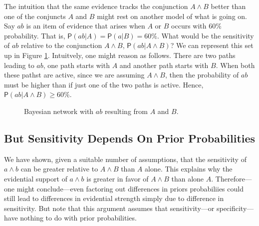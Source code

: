 \documentclass[
  10pt,
  dvipsnames,enabledeprecatedfontcommands]{scrartcl}
\newcommand{\pr}[1]{\mathsf{P}(#1)}
\begin{document}
The intuition that the same evidence tracks the conjunction
\(A\wedge B\) better than one of the conjuncts \(A\) and \(B\) might
rest on another model of what is going on. Say \(ab\) is an item of
evidence that arises when \(A\) or \(B\) occurs with \(60\%\)
probability. That is, \(\pr{ab \vert A}=\pr{a \vert B}=60\%\). What
would be the sensitivity of \(ab\) relative to the conjunction
\(A\wedge B\), \(\pr{ab \vert A\wedge B}\)? We can represent this set up
in Figure \ref{network-ab}. Intuitvely, one might reason as follows.
There are two paths leading to \(ab\), one path starts with \(A\) and
another path starts with \(B\). When both these pathst are active, since
we are assuming \(A\wedge B\), then the probability of \(ab\) must be
higher than if just one of the two paths is active. Hence,
\(\pr{ab \vert A\wedge B}\geq 60\%\).

\begin{center}
\begin{figure}[h!]

\caption{Bayesian network with $ab$ resulting from $A$ and $B$.}
\label{network-ab}
\end{figure}
\end{center}

\hypertarget{but-sensitivity-depends-on-prior-probabilities}{%
\subsection{But Sensitivity Depends On Prior
Probabilities}\label{but-sensitivity-depends-on-prior-probabilities}}

We have shown, given a suitable number of assumptions, that the
sensitivity of \(a\wedge b\) can be greater relative to \(A \wedge B\)
than \(A\) alone. This explains why the evidential support of
\(a\wedge b\) is greater in favor of \(A \wedge B\) than alone \(A\).
Therefore---one might conclude---even factoring out differences in
priors probabiliies could still lead to differences in evidential
strength simply due to difference in sensitivity. But note that this
argument assumes that sensitivity---or specificity---have nothing to do
with prior probabilities.
\end{document}
